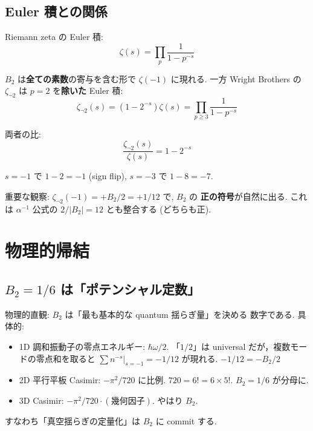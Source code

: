 \documentclass[11pt,a4paper]{article}
\begin{document}
\subsection{Euler 積との関係}

Riemann zeta の Euler 積:
\begin{equation}
\zeta(s) = \prod_{p} \frac{1}{1 - p^{-s}}
\end{equation}

$B_2$ は\textbf{全ての素数}の寄与を含む形で $\zeta(-1)$ に現れる.
一方 Wright Brothers の $\zeta_{\neg 2}$ は $p=2$ を\textbf{除いた}
Euler 積:
\begin{equation}
\zeta_{\neg 2}(s) = (1 - 2^{-s})\zeta(s) = \prod_{p \geq 3}\frac{1}{1 - p^{-s}}
\end{equation}

両者の比:
\begin{equation}
\frac{\zeta_{\neg 2}(s)}{\zeta(s)} = 1 - 2^{-s}
\end{equation}

$s = -1$ で $1 - 2 = -1$ (sign flip), $s = -3$ で $1 - 8 = -7$.

重要な観察: \textbf{$\zeta_{\neg 2}(-1) = +B_2/2 = +1/12$} で, $B_2$ の
\textbf{正の符号}が自然に出る. これは $\alpha^{-1}$ 公式の $2/|B_2| = 12$
とも整合する (どちらも正).

\section{物理的帰結}

\subsection{$B_2 = 1/6$ は「ポテンシャル定数」}

物理的直観: $B_2$ は「最も基本的な quantum 揺らぎ量」を決める
数字である. 具体的:
\begin{itemize}
\item 1D 調和振動子の零点エネルギー: $\hbar\omega/2$.
「$1/2$」は universal だが，複数モードの零点和を取ると
$\sum n^{-s}|_{s=-1} = -1/12$ が現れる.
$-1/12 = -B_2/2$
\item 2D 平行平板 Casimir: $-\pi^2/720$ に比例.
$720 = 6! = 6 \times 5!$. $B_2 = 1/6$ が分母に.
\item 3D Casimir: $-\pi^2/720 \cdot (\text{幾何因子})$. やはり $B_2$.
\end{itemize}

すなわち「真空揺らぎの定量化」は $B_2$ に commit する.
\end{document}
